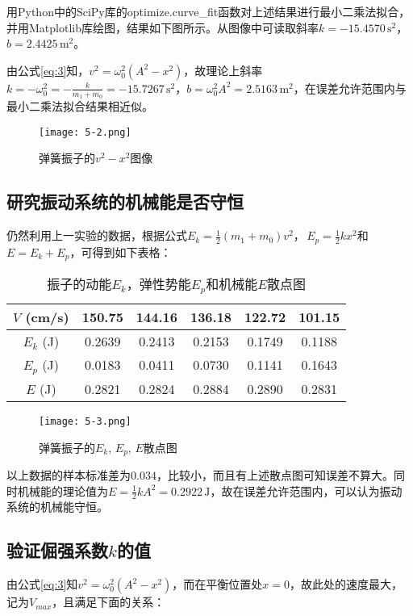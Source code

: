 \documentclass[12pt]{article}
\begin{document}
用Python中的SciPy库的optimize.curve_fit函数对上述结果进行最小二乘法拟合，并用Matplotlib库绘图，结果如下图所示。从图像中可读取斜率$k=-15.4570\,\mathrm{s}^2$，$b=2.4425\,\mathrm{m}^2$。

由公式\ref{eq:3}知，$v^2=\omega_0^2(A^2-x^2)$，故理论上斜率$k=-\omega_0^2=-\frac{k}{m_1+m_0}=-15.7267\,\mathrm{s}^2$，$b=\omega_0^2A^2=2.5163\,\mathrm{m}^2$，在误差允许范围内与最小二乘法拟合结果相近似。

\begin{figure}[htbp]
    \centering
    \texttt{[image: 5-2.png]}
    \caption{弹簧振子的$v^2-x^2$图像}
\end{figure}

\newpage
\subsection{研究振动系统的机械能是否守恒}
仍然利用上一实验的数据，根据公式$E_k=\frac{1}{2}(m_1+m_0)v^2$，$\,E_p=\frac{1}{2}kx^2$和$E=E_k+E_p$，可得到如下表格：

\begin{table}[htbp]
    \centering
    \begin{tabular}{|c|c|c|c|c|c|}
    \hline
    $V$ (cm/s) & 150.75  & 144.16  & 136.18  & 122.72  & 101.15  \\
    \hline
    $E_k$ (J) & 0.2639  & 0.2413  & 0.2153  & 0.1749  & 0.1188  \\
    \hline
    $E_p$ (J) & 0.0183  & 0.0411  & 0.0730  & 0.1141  & 0.1643  \\
    \hline
    $E$ (J) & 0.2821  & 0.2824  & 0.2884  & 0.2890  & 0.2831  \\
    \hline
    \end{tabular}
    \caption{振子的动能$E_k$，弹性势能$E_p$和机械能$E$散点图}
\end{table}

\begin{figure}[htbp]
    \centering
    \texttt{[image: 5-3.png]}
    \caption{弹簧振子的$E_k,\,E_p,\,E$散点图}
\end{figure}

以上数据的样本标准差为$0.034$，比较小，而且有上述散点图可知误差不算大。同时机械能的理论值为$E=\frac{1}{2}kA^2=0.2922\,\mathrm{J}$，故在误差允许范围内，可以认为振动系统的机械能守恒。

\subsection{验证倔强系数$k$的值}
由公式\ref{eq:3}知$v^2=\omega_0^2(A^2-x^2)$，而在平衡位置处$x=0$，故此处的速度最大，记为$V_{max}$，且满足下面的关系：
\end{document}
